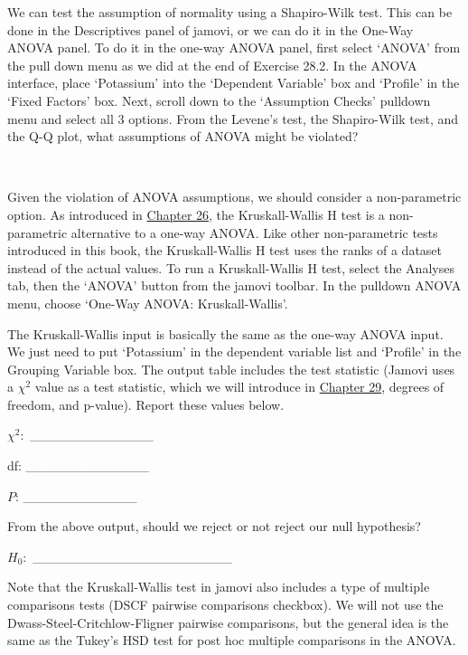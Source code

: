 \documentclass[
  openany]{krantz}
\begin{document}
\begin{verbatim}

\end{verbatim}

We can test the assumption of normality using a Shapiro-Wilk test.
This can be done in the Descriptives panel of jamovi, or we can do it in the One-Way ANOVA panel.
To do it in the one-way ANOVA panel, first select `ANOVA' from the pull down menu as we did at the end of Exercise 28.2.
In the ANOVA interface, place `Potassium' into the `Dependent Variable' box and `Profile' in the `Fixed Factors' box.
Next, scroll down to the `Assumption Checks' pulldown menu and select all 3 options.
From the Levene's test, the Shapiro-Wilk test, and the Q-Q plot, what assumptions of ANOVA might be violated?

\begin{verbatim}


\end{verbatim}

Given the violation of ANOVA assumptions, we should consider a non-parametric option.
As introduced in \protect\hyperlink{Chapter_26}{Chapter 26}, the Kruskall-Wallis H test is a non-parametric alternative to a one-way ANOVA.
Like other non-parametric tests introduced in this book, the Kruskall-Wallis H test uses the ranks of a dataset instead of the actual values.
To run a Kruskall-Wallis H test, select the Analyses tab, then the `ANOVA' button from the jamovi toolbar.
In the pulldown ANOVA menu, choose `One-Way ANOVA: Kruskall-Wallis'.

The Kruskall-Wallis input is basically the same as the one-way ANOVA input.
We just need to put `Potassium' in the dependent variable list and `Profile' in the Grouping Variable box.
The output table includes the test statistic (Jamovi uses a \(\chi^{2}\) value as a test statistic, which we will introduce in \protect\hyperlink{Chapter_29}{Chapter 29}, degrees of freedom, and p-value).
Report these values below.

\(\chi^{2}:\) \_\_\_\_\_\_\_\_\_\_\_\_\_

df: \_\_\_\_\_\_\_\_\_\_\_\_\_

\(P\): \_\_\_\_\_\_\_\_\_\_\_\_

From the above output, should we reject or not reject our null hypothesis?

\(H_{0}:\) \_\_\_\_\_\_\_\_\_\_\_\_\_\_\_\_\_\_\_\_\_

Note that the Kruskall-Wallis test in jamovi also includes a type of multiple comparisons tests (DSCF pairwise comparisons checkbox).
We will not use the Dwass-Steel-Critchlow-Fligner pairwise comparisons, but the general idea is the same as the Tukey's HSD test for post hoc multiple comparisons in the ANOVA.
\end{document}
